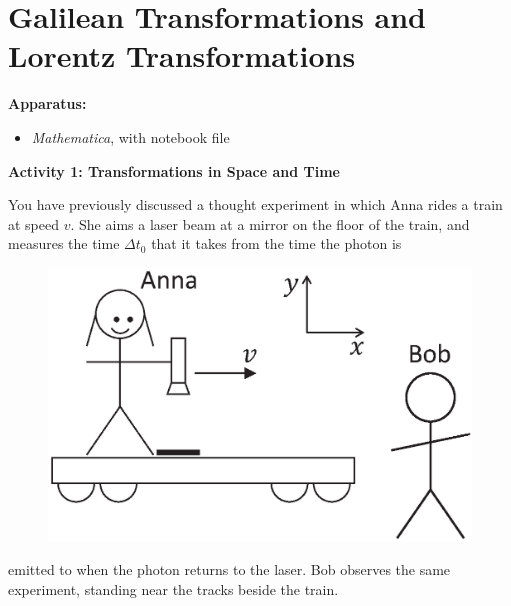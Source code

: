 \section{Galilean Transformations and Lorentz Transformations}


\makelabheader %

\bigskip
\textbf{Apparatus:}
\begin{itemize}[nosep]
\item \textit{Mathematica}, with notebook file 
\end{itemize}


\bigskip


\textbf{Activity 1: Transformations in Space and Time}

You have previously discussed a thought experiment in which Anna rides a train at speed $v$.  She aims a laser beam at a mirror on the floor of the train, and measures the time $\Delta t_0$ that it takes from the time the photon is 
\begin{figure}
\begin{center}
\vspace{-0.3in}
\includegraphics[scale=0.4]{lorentz_transformations/anna_and_bob.eps}
\end{center}
\end{figure}
emitted to when the photon returns to the laser.  Bob observes the same experiment, standing near the tracks beside the train.  

